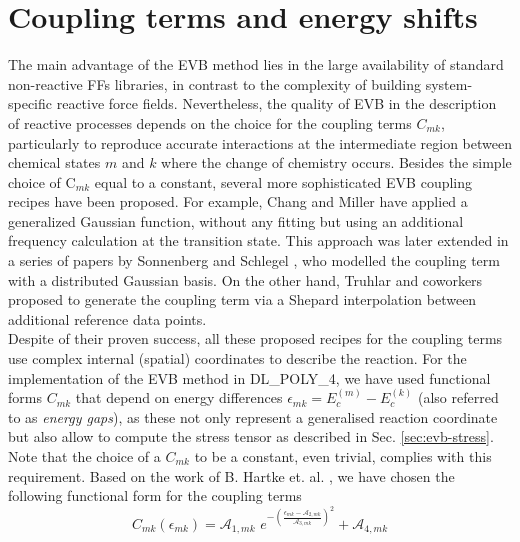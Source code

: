 \section{Coupling terms and energy shifts}\label{sec:coupling}
The main advantage of the EVB method lies in the large availability of standard non-reactive FFs libraries, in contrast to the complexity of building system-specific reactive force fields. Nevertheless, the quality of EVB in the description of reactive processes depends on the choice for the coupling terms $C_{mk}$, particularly to reproduce accurate interactions at the intermediate region between chemical states $m$ and $k$ where the change of chemistry occurs. 
Besides the simple choice of C$_{mk}$ equal to a constant, several more sophisticated EVB coupling recipes have been proposed. For example, Chang and Miller \cite{chang1990} have applied a generalized Gaussian function, without any fitting but using an additional frequency calculation at the transition state. This approach was later extended in a series of papers by Sonnenberg and Schlegel \cite{schlegel2006,sonnenberg2007,sonnenberg2009}, who modelled the coupling term with a distributed Gaussian basis. On the other hand, Truhlar and coworkers \cite{truhlar2000} proposed to generate the coupling term via a Shepard interpolation between additional reference data points.\\ 
Despite of their proven success, all these proposed recipes for the coupling terms use complex internal (spatial) coordinates to describe the reaction. For the implementation of the EVB method in DL\_POLY\_4, we have used functional forms $C_{mk}$ that depend on energy differences $\epsilon_{mk}=E^{(m)}_{c}-E^{(k)}_{c}$ (also referred to as {\it energy gaps}), as these not only represent a generalised reaction coordinate \cite{duarte2017,warshel1991,hartke2015,mones2009} but also allow to compute the stress tensor as described in Sec. \ref{sec:evb-stress}. Note that the choice of a $C_{mk}$ to be a constant, even trivial, complies with this requirement. Based on the work of B. Hartke et. al. \cite{hartke2015}, we have chosen the following functional form for the coupling terms 
\begin{equation}\label{eq:coupl}
C_{mk}(\epsilon_{mk})=\mathcal{A}_{1,mk} \, \, e^{-\left( \frac{\epsilon_{mk}-\mathcal{A}_{2,mk}} {\mathcal{A}_{3,mk}}  \right)^2 }+\mathcal{A}_{4,mk}
\end{equation}
